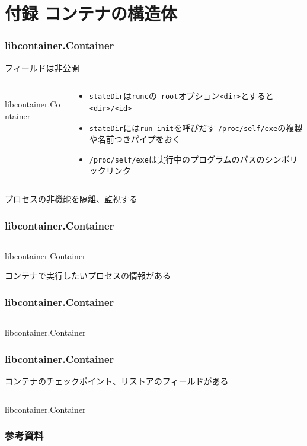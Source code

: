 \documentclass[unicode, 14pt, aspectratio=169]{beamer}
\begin{document}
\section{付録 コンテナの構造体}
\begin{frame}
  \frametitle{libcontainer.Container}
  フィールドは非公開
  \begin{columns}
    \begin{column}{0.5\textwidth}
      \begin{center}
        \inputminted{go}{code/container.go}
        libcontainer.Container\supercite{libcontainer}
      \end{center}
    \end{column}
    \begin{column}{0.5\textwidth}  %
      \begin{itemize}[leftmargin=0.2cm,label=$\circ$]
        \item \texttt{stateDir}は\texttt{runc}の\texttt{--root}オプション\texttt{<dir>}とすると\texttt{<dir>/<id>}
        \item \texttt{stateDir}には\texttt{run init}を呼びだす \texttt{/proc/self/exe}の複製や名前つきパイプをおく
        \item \texttt{/proc/self/exe}は実行中のプログラムのパスのシンボリックリンク
      \end{itemize}
    \end{column}
  \end{columns}
\end{frame}
\begin{frame}
  プロセスの非機能を隔離、監視\supercite{rdt}する
  \frametitle{libcontainer.Container}
  \begin{center}
    \inputminted{go}{code/container2.go}
    libcontainer.Container\supercite{libcontainer}
  \end{center}
\end{frame}
\begin{frame}
  コンテナで実行したいプロセスの情報がある
  \frametitle{libcontainer.Container}
  \begin{center}
    \inputminted{go}{code/container3.go}
    libcontainer.Container\supercite{libcontainer}
  \end{center}
\end{frame}
\begin{frame}[t]
  \frametitle{libcontainer.Container}
  コンテナのチェックポイント、リストアのフィールドがある\supercite{criu}
  \begin{center}
    \inputminted{go}{code/container4.go}
    libcontainer.Container\supercite{libcontainer}
  \end{center}
\end{frame}
\begin{frame}[allowframebreaks]
  \frametitle{参考資料}
  \printbibliography
  \nocite{*} 
\end{frame}
\end{document}
